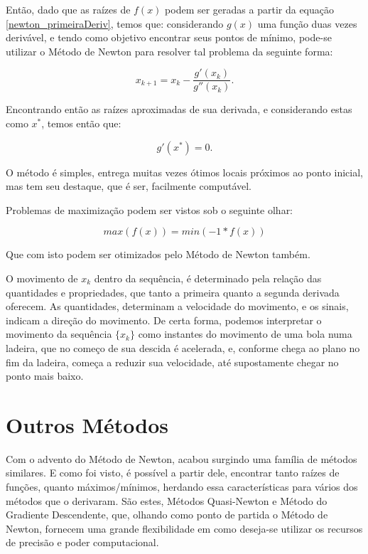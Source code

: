 
Então, dado que as raízes de $f(x)$ podem ser geradas a partir da equação
\ref{newton_primeiraDeriv}, temos que: considerando $g(x)$ uma função duas vezes
derivável, e tendo como objetivo encontrar seus pontos de mínimo, pode-se
utilizar o Método de Newton para resolver tal problema da seguinte forma:

\begin{equation}
    x_{k+1} = x_{k} - \frac {g'(x_{k})}{g''(x_{k})}.
\end{equation}

Encontrando então as raízes aproximadas de sua derivada, e considerando
estas como  $x^*$, temos então que:

\begin{equation}
    g'(x^*) = 0.
\end{equation}

O método é simples, entrega muitas vezes ótimos locais próximos ao ponto
inicial, mas tem seu destaque, que é ser, facilmente computável.

Problemas de maximização podem ser vistos sob o seguinte olhar:

\begin{equation}
    max(f(x)) = min(-1 * f(x))
\end{equation}

Que com isto podem ser otimizados pelo Método de Newton também.

O movimento de \(x_k\) dentro da sequência, é determinado pela relação das
quantidades e propriedades, que tanto a primeira quanto a segunda derivada
oferecem. As quantidades, determinam a velocidade do movimento, e os sinais,
indicam a direção do movimento. De certa forma, podemos interpretar o movimento
da sequência \(\{x_k\}\) como instantes do movimento de uma bola numa ladeira,
que no começo de sua descida é acelerada, e, conforme chega ao plano no fim da
ladeira, começa a reduzir sua velocidade, até supostamente chegar no ponto mais
baixo.


\section{{Outros Métodos}}

Com o advento do Método de Newton, acabou surgindo uma família de métodos
similares. E como foi visto, é possível a partir dele, encontrar tanto raízes
de funções, quanto máximos/mínimos, herdando essa características para vários
dos métodos que o derivaram. São estes, Métodos Quasi-Newton e Método do
Gradiente Descendente, que, olhando como ponto de partida o Método de Newton,
fornecem uma grande flexibilidade em como deseja-se utilizar os recursos de
precisão e poder computacional.

